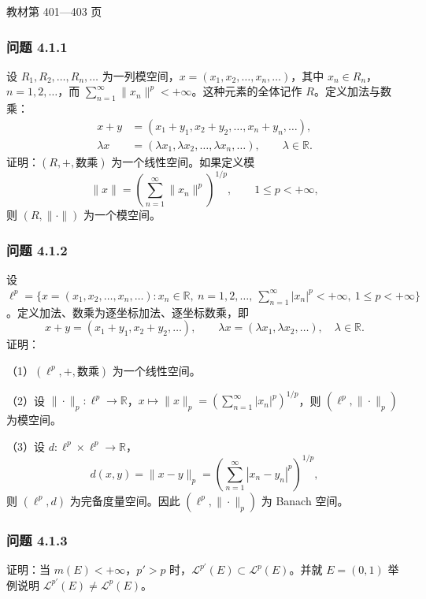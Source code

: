 \documentclass[11pt,a4paper]{article}
\begin{document}
教材第 401---403 页

\subsubsection{问题 4.1.1}\label{ch04-practice-ux95eeux9898-4.1.1}

设 \(R_1,R_2,\ldots,R_n,\ldots\)
为一列模空间，\(x=(x_1,x_2,\ldots,x_n,\ldots)\)，其中
\(x_n\in R_n\)，\(n=1,2,\ldots\)，而
\(\sum_{n=1}^\infty\|x_n\|^p<+\infty\)。这种元素的全体记作
\(R\)。定义加法与数乘： \[
\begin{aligned}
x+y&=(x_1+y_1,x_2+y_2,\ldots,x_n+y_n,\ldots),\\
\lambda x&=(\lambda x_1,\lambda x_2,\ldots,\lambda x_n,\ldots),\qquad\lambda\in\mathbb R.
\end{aligned}
\] 证明：\((R,+,\text{数乘})\) 为一个线性空间。如果定义模 \[
\|x\|=\left(\sum_{n=1}^\infty\|x_n\|^p\right)^{1/p},\qquad1\le p<+\infty,
\] 则 \((R,\|\cdot\|)\) 为一个模空间。

\subsubsection{问题 4.1.2}\label{ch04-practice-ux95eeux9898-4.1.2}

设
\(\ell^p=\{x=(x_1,x_2,\ldots,x_n,\ldots):x_n\in\mathbb R,\ n=1,2,\ldots,\ \sum_{n=1}^\infty|x_n|^p<+\infty,\ 1\le p<+\infty\}\)。定义加法、数乘为逐坐标加法、逐坐标数乘，即
\[
x+y=(x_1+y_1,x_2+y_2,\ldots),\qquad\lambda x=(\lambda x_1,\lambda x_2,\ldots),\quad\lambda\in\mathbb R.
\] 证明：

（1）\((\ell^p,+,\text{数乘})\) 为一个线性空间。

（2）设
\(\|\cdot\|_p:\ell^p\to\mathbb R\)，\(x\mapsto\|x\|_p=(\sum_{n=1}^\infty|x_n|^p)^{1/p}\)，则
\((\ell^p,\|\cdot\|_p)\) 为模空间。

（3）设 \(d:\ell^p\times\ell^p\to\mathbb R\)， \[
d(x,y)=\|x-y\|_p=\left(\sum_{n=1}^\infty|x_n-y_n|^p\right)^{1/p},
\] 则 \((\ell^p,d)\) 为完备度量空间。因此 \((\ell^p,\|\cdot\|_p)\) 为
Banach 空间。

\subsubsection{问题 4.1.3}\label{ch04-practice-ux95eeux9898-4.1.3}

证明：当 \(m(E)<+\infty\)，\(p'>p\)
时，\(\mathcal L^{p'}(E)\subset\mathcal L^p(E)\)。并就 \(E=(0,1)\)
举例说明 \(\mathcal L^{p'}(E)\ne\mathcal L^p(E)\)。
\end{document}
